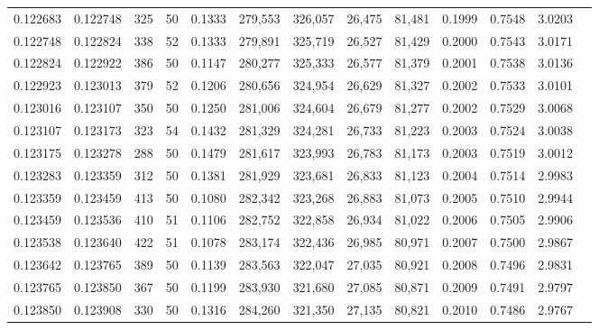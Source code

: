 \begin{tabular}{rrrrrrrrrrrrr}
0.122683 & 0.122748 &   325 &  50 &                                     0.1333 & 279,553 & 326,057 &  26,475 &  81,481 & 0.1999 & 0.7548 & 3.0203 \\
0.122748 & 0.122824 &   338 &  52 &                                     0.1333 & 279,891 & 325,719 &  26,527 &  81,429 & 0.2000 & 0.7543 & 3.0171 \\
0.122824 & 0.122922 &   386 &  50 &                                     0.1147 & 280,277 & 325,333 &  26,577 &  81,379 & 0.2001 & 0.7538 & 3.0136 \\
0.122923 & 0.123013 &   379 &  52 &                                     0.1206 & 280,656 & 324,954 &  26,629 &  81,327 & 0.2002 & 0.7533 & 3.0101 \\
0.123016 & 0.123107 &   350 &  50 &                                     0.1250 & 281,006 & 324,604 &  26,679 &  81,277 & 0.2002 & 0.7529 & 3.0068 \\
0.123107 & 0.123173 &   323 &  54 &                                     0.1432 & 281,329 & 324,281 &  26,733 &  81,223 & 0.2003 & 0.7524 & 3.0038 \\
0.123175 & 0.123278 &   288 &  50 &                                     0.1479 & 281,617 & 323,993 &  26,783 &  81,173 & 0.2003 & 0.7519 & 3.0012 \\
0.123283 & 0.123359 &   312 &  50 &                                     0.1381 & 281,929 & 323,681 &  26,833 &  81,123 & 0.2004 & 0.7514 & 2.9983 \\
0.123359 & 0.123459 &   413 &  50 &                                     0.1080 & 282,342 & 323,268 &  26,883 &  81,073 & 0.2005 & 0.7510 & 2.9944 \\
0.123459 & 0.123536 &   410 &  51 &                                     0.1106 & 282,752 & 322,858 &  26,934 &  81,022 & 0.2006 & 0.7505 & 2.9906 \\
0.123538 & 0.123640 &   422 &  51 &                                     0.1078 & 283,174 & 322,436 &  26,985 &  80,971 & 0.2007 & 0.7500 & 2.9867 \\
0.123642 & 0.123765 &   389 &  50 &                                     0.1139 & 283,563 & 322,047 &  27,035 &  80,921 & 0.2008 & 0.7496 & 2.9831 \\
0.123765 & 0.123850 &   367 &  50 &                                     0.1199 & 283,930 & 321,680 &  27,085 &  80,871 & 0.2009 & 0.7491 & 2.9797 \\
0.123850 & 0.123908 &   330 &  50 &                                     0.1316 & 284,260 & 321,350 &  27,135 &  80,821 & 0.2010 & 0.7486 & 2.9767 \\

\end{tabular}
